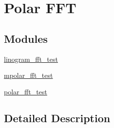 \hypertarget{group__applications__polarFFT}{\section{Polar F\-F\-T}
\label{group__applications__polarFFT}
}
\subsection*{Modules}
\begin{DoxyCompactItemize}
\item 
\hyperlink{group__applications__polarFFT__linogramm}{linogram\-\_\-fft\-\_\-test}
\item 
\hyperlink{group__applications__polarFFT__mpolar}{mpolar\-\_\-fft\-\_\-test}
\item 
\hyperlink{group__applications__polarFFT__polar}{polar\-\_\-fft\-\_\-test}
\end{DoxyCompactItemize}


\subsection{Detailed Description}
